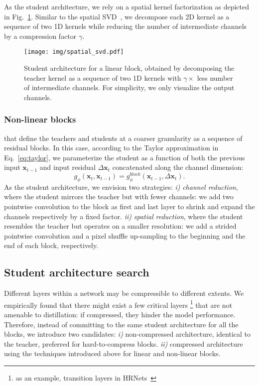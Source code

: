 \documentclass[runningheads]{llncs}
\def\x{\mathbf{x}}
\def\xt{\x_t}
\def\dxt{\Delta\xt}
\def\gphi{g_{\phi}}
\begin{document}
As the student architecture, we rely on a spatial kernel factorization as depicted in Fig.~\ref{fig:svd_like}. Similar to the spatial SVD~\cite{spatial_svd}, we decompose each 2D kernel as a sequence of two 1D kernels while reducing the number of intermediate channels by a compression factor $\gamma$.
\begin{figure}[t!]
\centering
\texttt{[image: img/spatial\_svd.pdf]}
\vspace{-2mm}
\caption{Student architecture for a linear block, obtained by decomposing the teacher kernel as a sequence of two 1D kernels with $\gamma \times$ less number of intermediate channels. For simplicity, we only visualize the output channels.
}
\vspace{-4mm}
\label{fig:svd_like}
\end{figure} 
\subsubsection{Non-linear blocks} that define the teachers and students at a coarser granularity as a sequence of residual blocks. In this case, according to the Taylor approximation in Eq.~\ref{eq:taylor}, we parameterize the student as a function of both the previous input $\x_{t-1}$ and input residual $\dxt$ concatenated along the channel dimension:
\begin{equation*}
\gphi(\xt, \x_{t-1}) = \gphi^{block}(\x_{t-1},\dxt).
\end{equation*}
As the student architecture, we envision two strategies: \textit{i)} \textit{channel reduction}, where the student mirrors the teacher but with fewer channels: we add two pointwise convolution to the block as first and last layer to shrink and expand the channels respectively by a fixed factor. \textit{ii)} \textit{spatial reduction}, where the student resembles the teacher but operates on a smaller resolution: we add a strided pointwise convolution and a pixel shuffle up-sampling to the beginning and the end of each block, respectively.
\subsection{Student architecture search}
Different layers within a network may be compressible to different extents.
We empirically found that there might exist a few critical layers
\footnote{as an example, transition layers in HRNets~\cite{hrnet}} 
that are not amenable to distillation: if compressed, they hinder the model performance.
Therefore, instead of committing to the same student architecture for all the blocks, we introduce two candidates: \textit{i)} non-compressed architecture, identical to the teacher, preferred for hard-to-compress blocks. \textit{ii)} compressed architecture using the techniques introduced above for linear and non-linear blocks.
\end{document}
